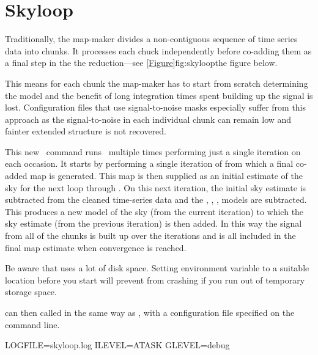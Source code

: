 \section{Skyloop}
\label{sec:skyloop}


Traditionally, the map-maker divides a non-contiguous sequence of time
series data into chunks. It processes each chuck independently
before co-adding them as a final step in the the reduction---see
\cref{Figure}{fig:skyloop}{the figure below}.

This means for each chunk the map-maker has to start from scratch
determining the  model and the benefit of long integration
times spent building up the signal is lost. Configuration files that use
signal-to-noise masks especially suffer from this approach as the
signal-to-noise in each individual chunk can remain low and fainter
extended structure is not recovered.

This new \skyloop\ command runs \makemap\ multiple times
performing just a single iteration on each occasion. It starts by
performing a single iteration of  from which a final
co-added map is generated. This map is then supplied as an initial
estimate of the sky for the next loop through . On
this next iteration, the initial sky estimate is subtracted from the
cleaned time-series data and the , ,
,  models are subtracted. This produces a new
model of the sky (from the current iteration) to which the sky
estimate (from the previous iteration) is then added. In this way the
signal from all of the chunks is built up over the iterations and is
all included in the final map estimate when convergence is reached.




Be aware that  uses a lot of disk space. Setting
environment variable  to a suitable location
before you start will prevent  from crashing
if you run out of temporary storage space.
\begin{terminalv}
\end{terminalv}
 can then called in the same way as \makemap, with
 a configuration file specified on the command line.
\begin{terminalv}
LOGFILE=skyloop.log ILEVEL=ATASK GLEVEL=debug
\end{terminalv}

